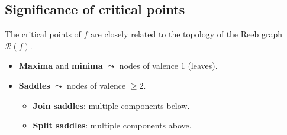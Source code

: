 \subsection*{Significance of critical points}
\begin{frame*}
The critical points of $f$ are closely related to the topology of the Reeb graph $\mathcal{R}(f)$.
\begin{itemize}
\item \textbf{Maxima} and \textbf{minima} $\leadsto$ nodes of valence $1$ (leaves).
\item \textbf{Saddles} $\leadsto$ nodes of valence $\ge 2$.\\
\begin{itemize}
\item \textbf{Join saddles}: multiple components below.
\item \textbf{Split saddles}: multiple components above.
\end{itemize}
\end{itemize}
\begin{center}
\end{center}
\end{frame*}